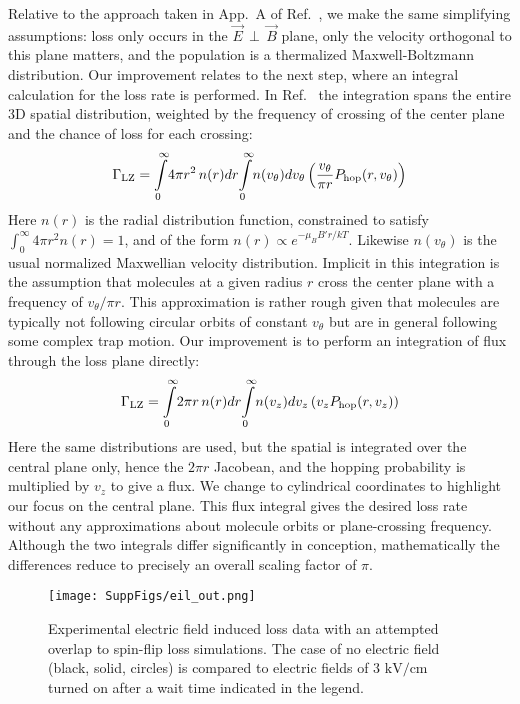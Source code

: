 \documentclass[%
 reprint,
 amsmath,amssymb,
 aps,
prl,
]{revtex4-1}
\newcommand{\epb}{{$\vec{E}\,{\perp}\,\vec{B}$}}
\begin{document}
Relative to the approach taken in App.~A of Ref.~\cite{Stuhl2013}, we make the same simplifying assumptions: loss only occurs in the \epb{} plane, only the velocity orthogonal to this plane matters, and the population is a thermalized Maxwell-Boltzmann distribution.
Our improvement relates to the next step, where an integral calculation for the loss rate is performed.
In Ref.~\cite{Stuhl2013} the integration spans the entire 3D spatial distribution, weighted by the frequency of crossing of the center plane and the chance of loss for each crossing:
\begin{equation}
\Gamma_\text{LZ}=\int\displaylimits_0^\infty\!4\pi r^2\,n(r)dr\!\int\displaylimits_0^\infty \!n(v_\theta)dv_\theta\left( \frac{v_\theta}{\pi r} P_\text{hop}(r,v_\theta)\right)
\end{equation}
Here $n(r)$ is the radial distribution function, constrained to satisfy $\int_0^\infty 4\pi r^2n(r)=1$, and of the form $n(r)\propto e^{-\mu_BB' r/kT}$. 
Likewise $n(v_\theta)$ is the usual normalized Maxwellian velocity distribution. 
Implicit in this integration is the assumption that molecules at a given radius $r$ cross the center plane with a frequency of $v_\theta/\pi r$.
This approximation is rather rough given that molecules are typically not following circular orbits of constant $v_\theta$ but are in general following some complex trap motion.
Our improvement is to perform an integration of flux through the loss plane directly:
\begin{equation}
\Gamma_\text{LZ}=\int\displaylimits_0^\infty\!2\pi r \,n(r)dr\!\int\displaylimits_0^\infty\! n(v_z)dv_z\left(v_z P_\text{hop}(r,v_z)\right)
\end{equation}
Here the same distributions are used, but the spatial is integrated over the central plane only, hence the $2\pi r$ Jacobean, and the hopping probability is multiplied by $v_z$ to give a flux.
We change to cylindrical coordinates to highlight our focus on the central plane.
This flux integral gives the desired loss rate without any approximations about molecule orbits or plane-crossing frequency.
Although the two integrals differ significantly in conception, mathematically the differences reduce to precisely an overall scaling factor of $\pi$.

\begin{figure}[t] 
\texttt{[image: SuppFigs/eil\_out.png]} 
\caption{Experimental electric field induced loss data with an attempted overlap to spin-flip loss simulations. The case of no electric field (black, solid, circles) is compared to electric fields of $3\text{ kV/cm}$ turned on after a wait time indicated in the legend.
\label{fig:eil}}
\end{figure}
\end{document}
